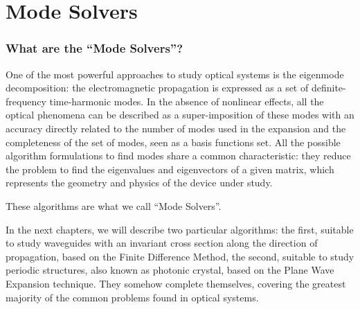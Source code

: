 \part{Mode Solvers} \label{par:mode_solvers} 

\section*{What are the ``Mode Solvers''?}

One of the most powerful approaches to study optical systems is the
eigenmode decomposition: the electromagnetic propagation is ex\-press\-ed
as a set of definite-frequency time-harmonic modes. In the absence of
nonlinear effects, all the optical phenomena can be described as a
super-imposition of these modes with an accuracy directly related to
the number of modes used in the expansion and the completeness of the
set of modes, seen as a basis functions set. All the possible
algorithm formulations to find modes share a common characteristic:
they reduce the problem to find the eigenvalues and eigenvectors of
a given matrix, which represents the geometry and physics of the
device under study.

These algorithms are what we call ``Mode Solvers''.

In the next chapters, we will describe two particular algorithms: the
first, suitable to study waveguides with an invariant cross section
along the direction of propagation, based on the Finite Difference
Method, the second, suitable to study periodic structures, also known
as photonic crystal, based on the Plane Wave Expansion technique. They
somehow complete themselves, covering the greatest majority of the
common problems found in optical systems.





